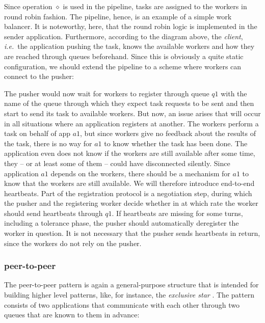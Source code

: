 \documentclass[a4paper]{scrartcl}
\newcommand\ie{\textit{i.e.}}
\newcommand{\term}[1]{\emph{#1}}
\newcommand{\menqOne}{\diamond}
\newcommand{\connect}[2]{
\draw [->,color=black] (#1) to (#2)
}
\begin{document}
Since operation $\menqOne$ is used
in the pipeline, tasks are assigned to the workers
in round robin fashion.
The pipeline, hence, is an example of a simple work balancer.
It is noteworthy, here, that the round robin logic
is implemented in the sender application. 
Furthermore, according to the diagram above,
the \term{client}, \ie\ the application pushing the task,
knows the available workers and how they are reached
through queues beforehand.
Since this is obviously a quite static configuration,
we should extend the pipeline to a scheme
where workers can connect to the pusher:


The pusher would now wait for workers to register
through queue $q1$ with the name of the queue 
through which they expect task requests to be sent
and then start to send its task to available workers.
But now, an issue arises that will occur in all situations
where an application registers at another.
The workers perform a task on behalf of app $a1$,
but since workers give no feedback about the results
of the task, there is no way for $a1$ to know
whether the task has been done.
The application even does not know
if the workers are still available after some time,
they -- or at least some of them -- could have
disconnected silently.
Since application $a1$ depends on the workers,
there should be a mechanism for $a1$ to know
that the workers are still available.
We will therefore introduce end-to-end heartbeats.
Part of the registration protocol is a negotiation step,
during which the pusher and the registering worker
decide whether in at which rate the worker should
send heartbeats through $q1$.
If heartbeats are missing for some turns,
including a tolerance phase,
the pusher should automatically deregister
the worker in question.
It is not necessary that the pusher sends heartbeats
in return, since the workers do not rely on the pusher.

\subsubsection{peer-to-peer}\label{subsub:peer}
The peer-to-peer pattern is again a general-purpose structure
that is intended for building higher level patterns,
like, for instance, the \term{exclusive star} \cite{cc13}.
The pattern consists of two applications
that communicate with each other through two queues
that are known to them in advance:
\end{document}
